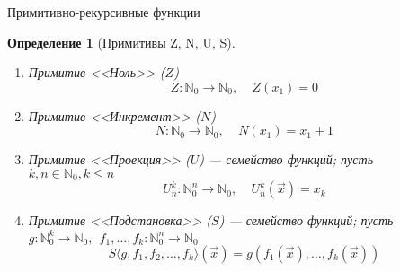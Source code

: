 \documentclass[handout]{beamer}
\newtheorem{dfn}{Определение}[section]
\begin{document}
\begin{frame}{Примитивно-рекурсивные функции}

\begin{dfn}[Примитивы Z, N, U, S]
\begin{enumerate}
\item Примитив <<Ноль>> ($Z$) \vspace{-0.3cm}
$$Z: \mathbb{N}_0\to\mathbb{N}_0,\ \ \ \ \ Z(x_1) = 0$$\vspace{-0.5cm}\pause
\item Примитив <<Инкремент>> ($N$) \vspace{-0.3cm}
$$N: \mathbb{N}_0\to\mathbb{N}_0,\ \ \ \ \ N(x_1) = x_1+1$$\vspace{-0.5cm}\pause
\item Примитив <<Проекция>> ($U$) — семейство функций; пусть $k,n \in \mathbb{N}_0, k \le n$\vspace{-0.3cm}
$$U^k_n: \mathbb{N}^n_0 \to \mathbb{N}_0,\ \ \ \ \ U^k_n(\overrightarrow{x}) = x_k$$\vspace{-0.5cm}\pause
\item Примитив <<Подстановка>> ($S$) --- семейство функций; пусть $g: \mathbb{N}^k_0 \to \mathbb{N}_0,\ \ f_1,\dots,f_k: \mathbb{N}^n_0 \to \mathbb{N}_0$
 \vspace{-0.3cm}
$$S\langle g,f_1,f_2,\dots,f_k \rangle (\overrightarrow{x}) = g(f_1(\overrightarrow{x}),\dots,f_k(\overrightarrow{x}))$$
\end{enumerate}
\end{dfn}
\end{frame}
\end{document}
